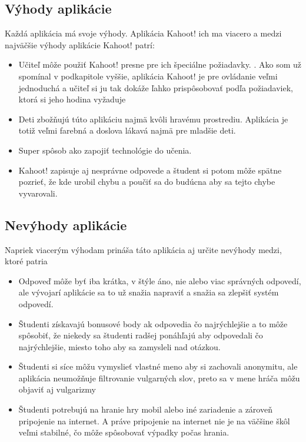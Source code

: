 \documentclass[10pt,oneside,slovak,a4paper]{article}
\begin{document}
\subsection{Výhody aplikácie} \label{ina:este}
Každá aplikácia má svoje výhody. Aplikácia Kahoot! ich ma viacero a medzi najväčšie výhody aplikácie Kahoot! patrí: 
\begin{itemize}
\item	Učiteľ môže použiť Kahoot! presne pre ich špeciálne požiadavky. \cite{Lauren}. Ako som už spomínal v podkapitole vyššie, aplikácia Kahoot! je pre ovládanie veľmi jednoduchá a učiteľ si ju tak dokáže ľahko prispôsobovať podľa požiadaviek, ktorá si jeho hodina vyžaduje
\item	Deti zbožňujú túto aplikáciu najmä kvôli hravému prostrediu.\cite{Lauren} Aplikácia je totiž veľmi farebná a doslova lákavá najmä pre mladšie deti. 
\item	Super spôsob ako zapojiť technológie do učenia.\cite{Lauren}
\item	Kahoot! zapisuje aj nesprávne odpovede a študent si potom môže spätne pozrieť, že kde urobil chybu a poučiť sa do budúcna aby sa tejto chybe vyvarovali. \cite{Lauren}


\end {itemize}

\subsection{Nevýhody aplikácie}
Napriek viacerým výhodam prináša táto aplikácia aj určite nevýhody medzi, ktoré patria
\begin{itemize}
\item	Odpoveď môže byť iba krátka, v štýle áno, nie alebo viac správných odpovedí, ale vývojarí aplikácie sa to už snažia napraviť a snažia sa zlepšiť systém odpovedí. \cite{Lauren}
\item	Študenti získavajú bonusové body ak odpovedia čo najrýchlejšie a to môže spôsobiť, že niekedy sa študenti radšej ponáhľajú aby odpovedali čo najrýchlejšie, miesto toho aby sa zamysleli nad otázkou.\cite{Lauren}
\item	Študenti si síce môžu vymyslieť vlastné meno aby si zachovali anonymitu, ale aplikácia neumožňuje filtrovanie vulgarných slov, preto sa v mene hráča môžu objaviť aj vulgarizmy \cite{nevyhoda}
\item	Študenti potrebujú na hranie hry mobil alebo iné zariadenie a zároveň pripojenie na internet. A práve pripojenie na internet nie je na väčšine škôl veľmi stabilné, čo môže spôsobovať výpadky počas hrania. \cite{nevyhoda}


\end {itemize}
\end{document}
